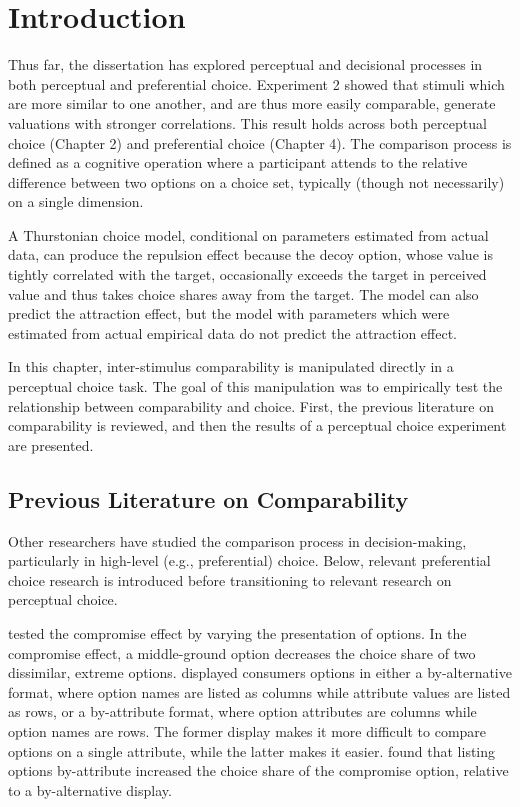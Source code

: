 \section{Introduction}
Thus far, the dissertation has explored perceptual and decisional processes in both perceptual and preferential choice. Experiment 2 showed that stimuli which are more similar to one another, and are thus more easily comparable, generate valuations with stronger correlations. This result holds across both perceptual choice (Chapter 2) and preferential choice (Chapter 4). The comparison process is defined as a cognitive operation where a participant attends to the relative difference between two options on a choice set, typically (though not necessarily) on a single dimension. 

A Thurstonian choice model, conditional on parameters estimated from actual data, can produce the repulsion effect \parencite{spektorWhenGoodLooks2018b,simonson2014vices} because the decoy option, whose value is tightly correlated with the target, occasionally exceeds the target in perceived value and thus takes choice shares away from the target. The model can also predict the attraction effect, but the model with parameters which were estimated from actual empirical data do not predict the attraction effect.

In this chapter, inter-stimulus comparability is manipulated directly in a perceptual choice task. The goal of this manipulation was to empirically test the relationship between comparability and choice. First, the previous literature on comparability is reviewed, and then the results of a perceptual choice experiment are presented.

\subsection{Previous Literature on Comparability}

Other researchers have studied the comparison process in decision-making, particularly in high-level (e.g., preferential) choice. Below, relevant preferential choice research is introduced before transitioning to relevant research on perceptual choice. 

\textcite{changWhichCompromiseOption2008} tested the compromise effect by varying the presentation of options. In the compromise effect, a middle-ground option decreases the choice share of two dissimilar, extreme options. \textcite{changWhichCompromiseOption2008} displayed consumers options in either a by-alternative format, where option names are listed as columns while attribute values are listed as rows, or a by-attribute format, where option attributes are columns while option names are rows. The former display makes it more difficult to compare options on a single attribute, while the latter makes it easier. \textcite{changWhichCompromiseOption2008} found that listing options by-attribute increased the choice share of the compromise option, relative to a by-alternative display. 

